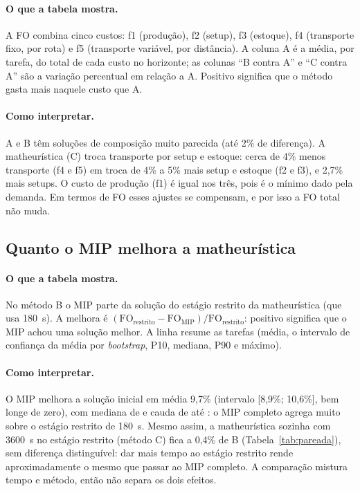 \documentclass[11pt,a4paper]{article}
\newcommand{\FO}{\mathrm{FO}}
\begin{document}
\paragraph{O que a tabela mostra.} A FO combina cinco custos: f1 (produção), f2
(setup), f3 (estoque), f4 (transporte fixo, por rota) e f5 (transporte
variável, por distância). A coluna A é a média, por tarefa, do total de cada
custo no horizonte; as colunas ``B contra A'' e ``C contra A'' são a variação
percentual em relação a A. Positivo significa que o método gasta mais naquele
custo que A.

\paragraph{Como interpretar.} A e B têm soluções de composição muito parecida (até 2\%
de diferença). A matheurística (C) troca transporte por setup e estoque:
cerca de 4\% menos transporte (f4 e f5) em troca de 4\% a 5\% mais setup e
estoque (f2 e f3), e 2,7\% mais setups. O custo de produção (f1) é igual nos
três, pois é o mínimo dado pela demanda. Em termos de FO esses ajustes se
compensam, e por isso a FO total não muda.

\subsection{Quanto o MIP melhora a matheurística}

\begin{table}[H]
  \centering
  \small
  
  \caption{Melhora relativa da FO do MIP sobre a solução do estágio restrito da
  matheurística (método B), por tarefa.}
  \label{tab:ganho-mip}
\end{table}

\paragraph{O que a tabela mostra.} No método B o MIP parte da solução do estágio
restrito da matheurística (que usa 180~s). A melhora é
$(\FO_{\text{restrito}}-\FO_{\text{MIP}})/\FO_{\text{restrito}}$: positivo significa que o MIP achou
uma solução melhor. A linha resume as \nPaired{} tarefas (média, o intervalo de confiança da
média por \emph{bootstrap}, P10, mediana, P90 e máximo).

\paragraph{Como interpretar.} O MIP melhora a solução inicial em média 9,7\% (intervalo
[8,9\%; 10,6\%], bem longe de zero), com mediana de \gainMedian{} e cauda de até \gainMax{}: o
MIP completo agrega muito sobre o estágio restrito de 180~s. Mesmo assim, a matheurística
sozinha com 3600~s no estágio restrito (método C) fica a 0,4\% de B
(Tabela~\ref{tab:pareada}), sem diferença distinguível: dar mais tempo ao estágio
restrito rende aproximadamente o mesmo que passar ao MIP completo. A comparação mistura
tempo e método, então não separa os dois efeitos.
\end{document}
